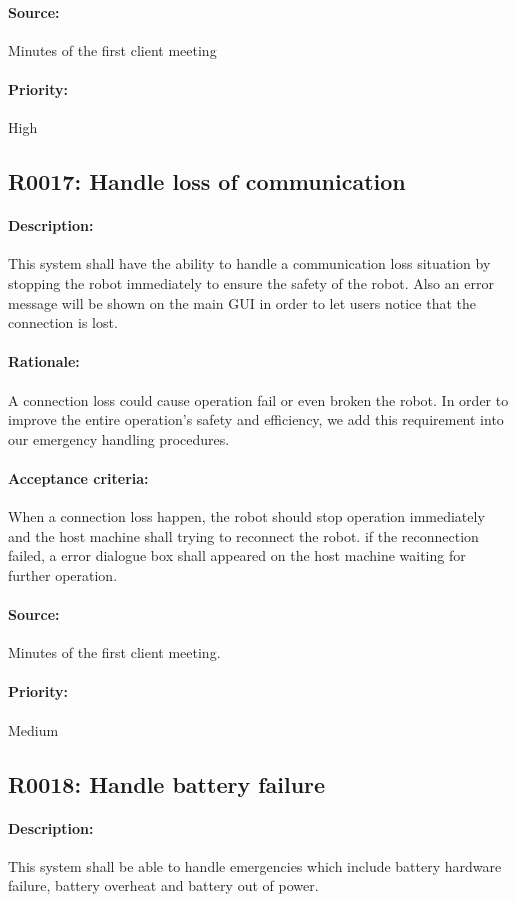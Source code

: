 \documentclass[11pt, a4paper]{report}
\begin{document}
\paragraph{Source:}
 Minutes of the first client meeting 
\paragraph{Priority:}
High  


\subsection{R0017: Handle loss of communication}
\paragraph{Description:}
This system shall have the ability to handle a communication loss situation by stopping the robot immediately to ensure the safety of the robot. Also an error message will be shown on the main GUI in order to let users notice that the connection is lost. 
\paragraph{Rationale:}
A connection loss could cause operation fail or even broken the robot. In order to improve the entire operation's safety and efficiency, we add this requirement into our emergency handling procedures. 
\paragraph{Acceptance criteria:}
When a connection loss happen, the robot should stop operation immediately and the host machine shall trying to reconnect the robot. if the reconnection failed, a error dialogue box shall appeared on the host machine waiting for further operation.
\paragraph{Source:}
Minutes of the first client meeting.
\paragraph{Priority:}
Medium


\subsection{R0018: Handle battery failure}
\paragraph{Description:}
This system shall be able to handle emergencies which include battery hardware failure, battery overheat and battery out of power.
\end{document}
